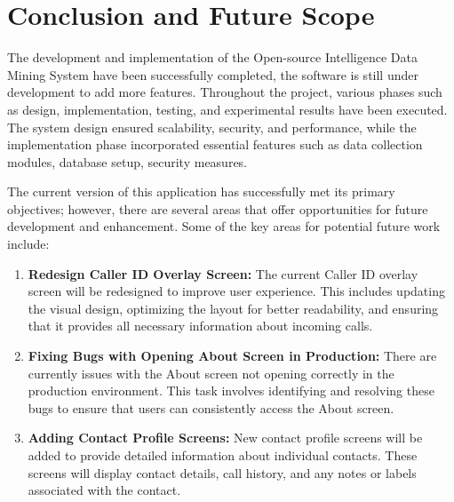 \chapter{Conclusion and Future Scope}\label{ch:conclusion-and-future-scope}

The development and implementation of the Open-source Intelligence Data Mining System have been successfully completed, the software is still under development to add more features.
Throughout the project, various phases such as design, implementation, testing, and experimental results have been executed.
The system design ensured scalability, security, and performance, while the implementation phase incorporated essential features such as data collection modules, database setup, security measures.

The current version of this application has successfully met its primary objectives; however, there are several areas that offer opportunities for future development and enhancement.
Some of the key areas for potential future work include:

\begin{enumerate}[label=\roman*.]
    \item \textbf{Redesign Caller ID Overlay Screen:}
    The current Caller ID overlay screen will be redesigned to improve user experience.
    This includes updating the visual design, optimizing the layout for better readability, and ensuring that it provides all necessary information about incoming calls.

    \item \textbf{Fixing Bugs with Opening About Screen in Production:}
    There are currently issues with the About screen not opening correctly in the production environment.
    This task involves identifying and resolving these bugs to ensure that users can consistently access the About screen.

    \item \textbf{Adding Contact Profile Screens:}
    New contact profile screens will be added to provide detailed information about individual contacts.
    These screens will display contact details, call history, and any notes or labels associated with the contact.

\end{enumerate}



